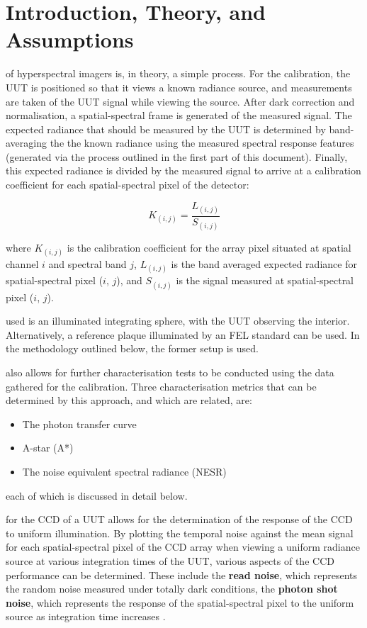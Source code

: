 \documentclass[nohyper,nobib]{tufte-book}
\begin{document}
\chapter{Introduction, Theory, and Assumptions}
\label{ch:radint}

 of hyperspectral imagers is, in theory, a simple process. For the calibration, the UUT is positioned so that it views a known radiance source, and measurements are taken of the UUT signal while viewing the source. After dark correction and normalisation, a spatial-spectral frame is generated of the measured signal. The expected radiance that should be measured by the UUT is determined by band-averaging the the known radiance using the measured spectral response features (generated via the process outlined in the first part of this document). Finally, this expected radiance is divided by the measured signal to arrive at a calibration coefficient for each spatial-spectral pixel of the detector:

\begin{equation}
	K_{(i, j)} = \frac{L_{(i,j)}}{S_{(i,j)}}
\end{equation}

where $K_{(i, j)}$ is the calibration coefficient for the array pixel situated at spatial channel $i$ and spectral band $j$, $L_{(i, j)}$ is the band averaged expected radiance for spatial-spectral pixel ($i$, $j$), and $S_{(i, j)}$ is the signal measured at spatial-spectral pixel ($i$, $j$). 

 used is an illuminated integrating sphere, with the UUT observing the interior. Alternatively, a reference plaque illuminated by an FEL standard can be used. In the methodology outlined below, the former setup is used. 

 also allows for further characterisation tests to be conducted using the data gathered for the calibration.  Three characterisation metrics that can be determined by this approach, and which are related, are:
	\begin{itemize}
		\item The photon transfer curve
		\item A-star (A*)
		\item The noise equivalent spectral radiance (NESR)
	\end{itemize}
each of which is discussed in detail below.

 for the CCD of a UUT allows for the determination of the response of the CCD to uniform illumination. By plotting the temporal noise against the mean signal for each spatial-spectral pixel of the CCD array when viewing a uniform radiance source at various integration times of the UUT, various aspects of the CCD performance can be determined. These include the  \textbf{read noise}, which represents the random noise measured under totally dark conditions, the \textbf{photon shot noise}, which represents the response of the spatial-spectral pixel to the uniform source as integration time increases \cite{Janesick2007}. 
\end{document}
